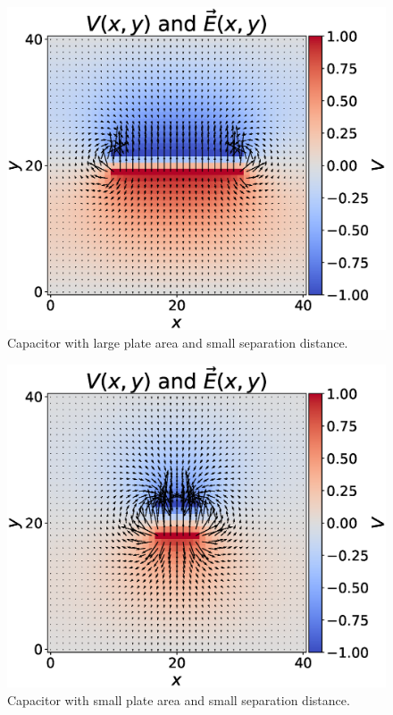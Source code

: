 \documentclass[12pt,twocolumn]{article}
\begin{document}
\begin{figure}
\includegraphics[width=\linewidth]{V_large_A_small_d.eps}
\caption{Capacitor with large plate area and small separation distance.}
\label{fig:large_A_small_d}
\end{figure}
\begin{figure}
\includegraphics[width=\linewidth]{V_small_A_small_d.eps}
\caption{Capacitor with small plate area and small separation distance.}
\label{fig:small_A_small_d}
\end{figure}
\end{document}
